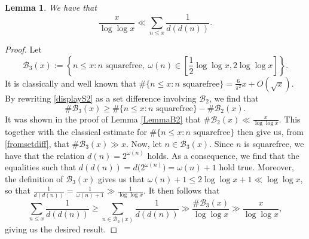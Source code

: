 \documentclass[10pt,a4paper]{amsart}
\newtheorem{lemma}{Lemma}
\begin{document}
\begin{lemma}\label{LemmaLower}
 We have that $$ \frac{x}{\log\log x} \ll \sum_{n\le x}\frac{1}{d(d(n))}. $$
\end{lemma}

\begin{proof}
Let
\begin{equation}\label{displayS2}
\mathcal{B}_{3}(x) := \left\{ n \le x : n \text{ squarefree},\ 
\omega(n) \in \left[\frac12\log\log x, 2\log\log x\right] \right\}.
\end{equation}
 It is classically and well known that $ \#\{n \le x : n \text{ squarefree}\} = \frac{6}{\pi^2}x + O(\sqrt{x})$. 
 By rewriting \eqref{displayS2} as a set difference involving $\mathcal{B}_{2}$, we find that
\begin{equation}\label{fromsetdiff}
 \#\mathcal{B}_{3}(x) \geq \#\{ n \leq x : \text{$n$ squarefree} \} 
 - \#\mathcal{B}_{2}(x). 
\end{equation}
 It was shown in the proof of Lemma \ref{LemmaB2} that $ \#\mathcal{B}_{2}(x) \ll \frac{x}{\log \log x}$. This together with the classical 
 estimate for $\#\{n \le x : n \text{ squarefree}\}$ then give us, from \eqref{fromsetdiff}, that $\#\mathcal{B}_{3}(x) \gg x$. Now, let 
 $n \in \mathcal{B}_{3}(x)$. Since \(n\) is squarefree, we have that the relation $ d(n) = 2^{\omega(n)}$ holds. As a consequence, we 
 find that the equalities such that $ d(d(n)) = d\big(2^{\omega(n)}\big)=\omega(n)+1 $ hold true. Moreover, the definition of 
 $\mathcal{B}_{3}(x)$ gives us that $ \omega(n)+1\leq 2\log\log x+1 \ll \log\log x$, so that $ \frac{1}{d(d(n))} = \frac{1}{\omega(n) + 
 1} \gg \frac{1}{\log\log x}$. It then follows that $$ \sum_{n \leq x} \frac{1}{d(d(n))} \geq \sum_{n\in\mathcal{B}_{3}(x)}\frac{1}{d(d(n))}
\gg \frac{\#\mathcal{B}_{3}(x)}{\log\log x} \gg
\frac{x}{\log\log x}, $$ giving us the desired result. 
\end{proof}
\end{document}
